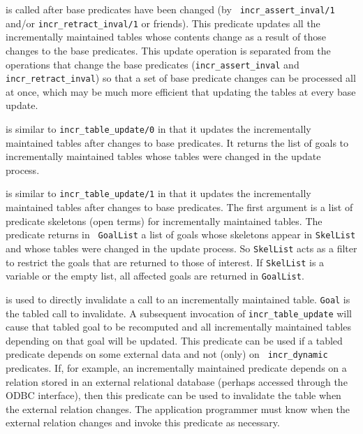 \begin{description}
is called after base predicates have been changed (by {\tt
incr\_assert\_inval/1} and/or {\tt incr\_retract\_inval/1} or
friends).  This predicate updates all the incrementally maintained
tables whose contents change as a result of those changes to the base
predicates.  This update operation is separated from the operations
that change the base predicates ({\tt incr\_assert\_inval} and {\tt
incr\_retract\_inval}) so that a set of base predicate changes can be
processed all at once, which may be much more efficient that updating
the tables at every base update.

is similar to {\tt incr\_table\_update/0} in that it updates the
incrementally maintained tables after changes to base predicates.  It
returns the list of goals to incrementally maintained tables whose
tables were changed in the update process.

is similar to {\tt incr\_table\_update/1} in that it updates the
incrementally maintained tables after changes to base predicates.  The
first argument is a list of predicate skeletons (open terms) for
incrementally maintained tables.  The predicate returns in {\tt
GoalList} a list of goals whose skeletons appear in {\tt SkelList} and
whose tables were changed in the update process.  So {\tt SkelList}
acts as a filter to restrict the goals that are returned to those of
interest.  If {\tt SkelList} is a variable or the empty list, all
affected goals are returned in {\tt GoalList}.

is used to directly invalidate a call to an incrementally maintained
table.  {\tt Goal} is the tabled call to invalidate.  A subsequent
invocation of {\tt incr\_table\_update} will cause that tabled goal to
be recomputed and all incrementally maintained tables depending on
that goal will be updated.  This predicate can be used if a tabled
predicate depends on some external data and not (only) on {\tt
incr\_dynamic} predicates.  If, for example, an incrementally
maintained predicate depends on a relation stored in an external
relational database (perhaps accessed through the ODBC interface),
then this predicate can be used to invalidate the table when the
external relation changes.  The application programmer must know when
the external relation changes and invoke this predicate as necessary.


\end{description}
